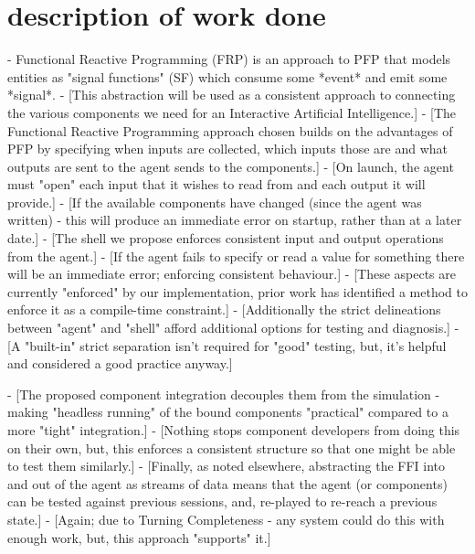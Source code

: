 

\section{description of work done}

- Functional Reactive Programming (FRP) is an approach to PFP that models entities as "signal functions" (SF) which consume some *event* and emit some *signal*.\footnotemark
- [This abstraction will be used as a consistent approach to connecting the various components we need for an Interactive Artificial Intelligence.]
- [The Functional Reactive Programming approach chosen builds on the advantages of PFP by specifying when inputs are collected, which inputs those are and what outputs are sent to the agent sends to the components.]
	- [On launch, the agent must "open" each input that it wishes to read from and each output it will provide.]
		- [If the available components have changed (since the agent was written) - this will produce an immediate error on startup, rather than at a later date.]
	- [The shell we propose enforces consistent input and output operations from the agent.]
		- [If the agent fails to specify or read a value for something there will be an immediate error; enforcing consistent behaviour.]
	- [These aspects are currently "enforced" by our implementation, prior work has identified a method to enforce it as a compile-time constraint.\cite{winograd2012wormholes}]
	- [Additionally the strict delineations between "agent" and "shell" afford additional options for testing and diagnosis.]
		- [A "built-in" strict separation isn't required for "good" testing, but, it's helpful and considered a good practice anyway.]


		- [The proposed component integration decouples them from the simulation - making "headless running" of the bound components "practical" compared to a more "tight" integration.]
			- [Nothing stops component developers from doing this on their own, but, this enforces a consistent structure so that one might be able to test them similarly.]
		- [Finally, as noted elsewhere, abstracting the FFI into and out of the agent as streams of data means that the agent (or components) can be tested against previous sessions, and, re-played to re-reach a previous state.]
			- [Again; due to Turning Completeness - any system could do this with enough work, but, this approach "supports" it.]


